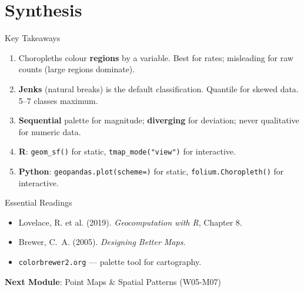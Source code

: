 \documentclass[10pt]{beamer}
\begin{document}
\section{Synthesis}
\begin{frame}{Key Takeaways}
\begin{enumerate}
\item Choropleths colour \textbf{regions} by a variable. Best for rates; misleading for raw counts (large regions dominate).
\item \textbf{Jenks} (natural breaks) is the default classification. Quantile for skewed data. 5--7 classes maximum.
\item \textbf{Sequential} palette for magnitude; \textbf{diverging} for deviation; never qualitative for numeric data.
\item \textbf{R}: \texttt{geom\_sf()} for static, \texttt{tmap\_mode("view")} for interactive.
\item \textbf{Python}: \texttt{geopandas.plot(scheme=)} for static, \texttt{folium.Choropleth()} for interactive.
\end{enumerate}
\end{frame}
\begin{frame}{Essential Readings}
\begin{itemize}
\item Lovelace, R. et al. (2019). \emph{Geocomputation with R}, Chapter 8.
\item Brewer, C.~A. (2005). \emph{Designing Better Maps}.
\item \texttt{colorbrewer2.org} --- palette tool for cartography.
\end{itemize}
\vspace{6pt}
\textbf{Next Module}: Point Maps \& Spatial Patterns (W05-M07)
\end{frame}
\end{document}
